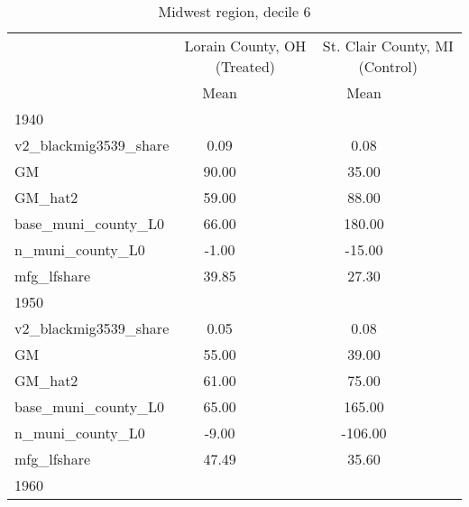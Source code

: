 \begin{table}[htbp]\centering
\def\sym#1{\ifmmode^{#1}\else\(^{#1}\)\fi}
\caption{Midwest region, decile 6 \label{tab1}}
\begin{tabular}{l*{2}{ccc}}
\toprule
                    &\multicolumn{3}{c}{Lorain County, OH (Treated)}&\multicolumn{3}{c}{St. Clair County, MI (Control)}\\
                    &        Mean&            &            &        Mean&            &            \\
\midrule
1940                &            &            &            &            &            &            \\
v2\_blackmig3539\_share&        0.09&            &            &        0.08&            &            \\
GM                  &       90.00&            &            &       35.00&            &            \\
GM\_hat2             &       59.00&            &            &       88.00&            &            \\
base\_muni\_county\_L0 &       66.00&            &            &      180.00&            &            \\
n\_muni\_county\_L0    &       -1.00&            &            &      -15.00&            &            \\
mfg\_lfshare         &       39.85&            &            &       27.30&            &            \\
\midrule
1950                &            &            &            &            &            &            \\
v2\_blackmig3539\_share&        0.05&            &            &        0.08&            &            \\
GM                  &       55.00&            &            &       39.00&            &            \\
GM\_hat2             &       61.00&            &            &       75.00&            &            \\
base\_muni\_county\_L0 &       65.00&            &            &      165.00&            &            \\
n\_muni\_county\_L0    &       -9.00&            &            &     -106.00&            &            \\
mfg\_lfshare         &       47.49&            &            &       35.60&            &            \\
\midrule
1960                &            &            &            &            &            &            \\

\end{tabular}
\end{table}
